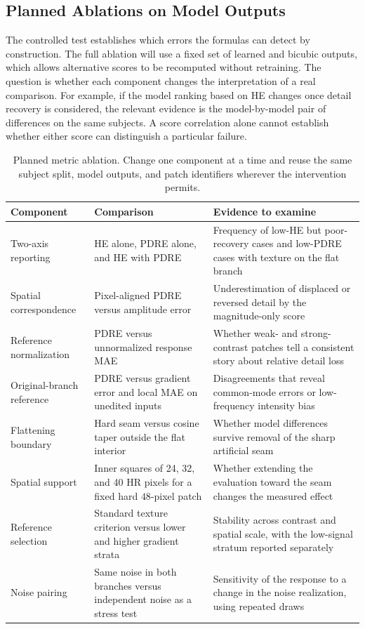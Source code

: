 \documentclass[journal]{IEEEtran}
\begin{document}
\subsection{Planned Ablations on Model Outputs}
\label{sec:planned-metric}
The controlled test establishes which errors the formulas can detect by construction. The full ablation will use a fixed set of learned and bicubic outputs, which allows alternative scores to be recomputed without retraining. The question is whether each component changes the interpretation of a real comparison. For example, if the model ranking based on HE changes once detail recovery is considered, the relevant evidence is the model-by-model pair of differences on the same subjects. A score correlation alone cannot establish whether either score can distinguish a particular failure.

\begin{table}[!t]
\centering
\caption{Planned metric ablation. Change one component at a time and reuse the same subject split, model outputs, and patch identifiers wherever the intervention permits.}
\label{tab:metric-ablation}
\small
\begin{tabular}{@{}>{\raggedright\arraybackslash}p{}>{\raggedright\arraybackslash}p{}>{\raggedright\arraybackslash}p{}@{}}
\toprule
Component & Comparison & Evidence to examine \\
\midrule
Two-axis reporting & HE alone, PDRE alone, and HE with PDRE & Frequency of low-HE but poor-recovery cases and low-PDRE cases with texture on the flat branch \\
Spatial correspondence & Pixel-aligned PDRE versus amplitude error & Underestimation of displaced or reversed detail by the magnitude-only score \\
Reference normalization & PDRE versus unnormalized response MAE & Whether weak- and strong-contrast patches tell a consistent story about relative detail loss \\
Original-branch reference & PDRE versus gradient error and local MAE on unedited inputs & Disagreements that reveal common-mode errors or low-frequency intensity bias \\
Flattening boundary & Hard seam versus cosine taper outside the flat interior & Whether model differences survive removal of the sharp artificial seam \\
Spatial support & Inner squares of 24, 32, and 40 HR pixels for a fixed hard $48$-pixel patch & Whether extending the evaluation toward the seam changes the measured effect \\
Reference selection & Standard texture criterion versus lower and higher gradient strata & Stability across contrast and spatial scale, with the low-signal stratum reported separately \\
Noise pairing & Same noise in both branches versus independent noise as a stress test & Sensitivity of the response to a change in the noise realization, using repeated draws \\
\bottomrule
\end{tabular}
\end{table}
\end{document}
